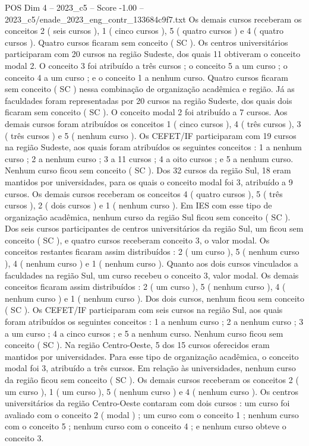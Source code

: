 \begin{textsample}{POS Dim 4 – 2023\_c5 – Score -1.00 – 2023\_c5/enade\_2023\_eng\_contr\_133684c9f7.txt}
Os demais cursos receberam os conceitos 2 ( seis cursos ), 1 ( cinco cursos ), 5 ( quatro cursos ) e 4 ( quatro cursos ).
Quatro cursos ficaram sem conceito ( SC ).
Os centros universitários participaram com 20 cursos na região Sudeste, dos quais 11 obtiveram o conceito modal 2.
O conceito 3 foi atribuído a três cursos ; o conceito 5 a um curso ; o conceito 4 a um curso ; e o conceito 1 a nenhum curso.
Quatro cursos ficaram sem conceito ( SC ) nessa combinação de organização acadêmica e região.
Já as faculdades foram representadas por 20 cursos na região Sudeste, dos quais dois ficaram sem conceito ( SC ).
O conceito modal 2 foi atribuído a 7 cursos.
Aos demais cursos foram atribuídos os conceitos 1 ( cinco cursos ), 4 ( três cursos ), 3 ( três cursos ) e 5 ( nenhum curso ).
Os CEFET/IF participaram com 19 cursos na região Sudeste, aos quais foram atribuídos os seguintes conceitos : 1 a nenhum curso ; 2 a nenhum curso ; 3 a 11 cursos ; 4 a oito cursos ; e 5 a nenhum curso.
Nenhum curso ficou sem conceito ( SC ).
Dos 32 cursos da região Sul, 18 eram mantidos por universidades, para os quais o conceito modal foi 3, atribuído a 9 cursos.
Os demais cursos receberam os conceitos 4 ( quatro cursos ), 5 ( três cursos ), 2 ( dois cursos ) e 1 ( nenhum curso ).
Em IES com esse tipo de organização acadêmica, nenhum curso da região Sul ficou sem conceito ( SC ).
Dos seis cursos participantes de centros universitários da região Sul, um ficou sem conceito ( SC ), e quatro cursos receberam conceito 3, o valor modal.
Os conceitos restantes ficaram assim distribuídos : 2 ( um curso ), 5 ( nenhum curso ), 4 ( nenhum curso ) e 1 ( nenhum curso ).
Quanto aos dois cursos vinculados a faculdades na região Sul, um curso recebeu o conceito 3, valor modal.
Os demais conceitos ficaram assim distribuídos : 2 ( um curso ), 5 ( nenhum curso ), 4 ( nenhum curso ) e 1 ( nenhum curso ).
Dos dois cursos, nenhum ficou sem conceito ( SC ).
Os CEFET/IF participaram com seis cursos na região Sul, aos quais foram atribuídos os seguintes conceitos : 1 a nenhum curso ; 2 a nenhum curso ; 3 a um curso ; 4 a cinco cursos ; e 5 a nenhum curso.
Nenhum curso ficou sem conceito ( SC ).
Na região Centro-Oeste, 5 dos 15 cursos oferecidos eram mantidos por universidades.
Para esse tipo de organização acadêmica, o conceito modal foi 3, atribuído a três cursos.
Em relação às universidades, nenhum curso da região ficou sem conceito ( SC ).
Os demais cursos receberam os conceitos 2 ( um curso ), 1 ( um curso ), 5 ( nenhum curso ) e 4 ( nenhum curso ).
Os centros universitários da região Centro-Oeste contaram com dois cursos : um curso foi avaliado com o conceito 2 ( modal ) ; um curso com o conceito 1 ; nenhum curso com o conceito 5 ; nenhum curso com o conceito 4 ; e nenhum curso obteve o conceito 3.

\end{textsample}
